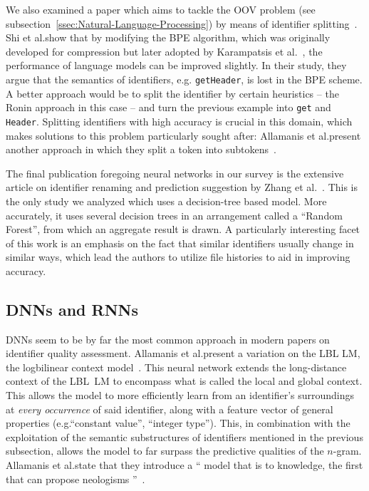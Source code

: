 \documentclass[conference]{IEEEtran}
\begin{document}
We also examined a paper which aims to tackle the \ac{OOV} problem (see
subsection~\ref{ssec:Natural-Language-Processing}) by means of identifier
splitting~\cite{Shi2022Splitting}. Shi et al.\@ show that by modifying the \ac{BPE}
algorithm, which was originally developed for compression but later adopted by Karampatsis
et al.\@~\cite{Karampatsis2020BPE}, the performance of language models can be improved
slightly. In their study, they argue that the semantics of identifiers, e.g.\@
\verb-getHeader-, is lost in the \ac{BPE} scheme. A better approach would be to split the
identifier by certain heuristics -- the Ronin approach in this case -- and turn the
previous example into \verb-get- and \verb-Header-. Splitting identifiers with high
accuracy is crucial in this domain, which makes solutions to this problem particularly
sought after: Allamanis et al.\@ present another approach in which they split a token into
subtokens~\cite{Allamanis2015Suggesting}.

The final publication foregoing neural networks in our survey is the extensive article on
identifier renaming and prediction suggestion by Zhang et
al.~\cite{Zhang2023RenamingPrediction}. This is the only study we analyzed which uses a
decision-tree based model. More accurately, it uses several decision trees in an
arrangement called a \enquote{Random Forest}, from which an aggregate result is drawn. A
particularly interesting facet of this work is an emphasis on the fact that similar
identifiers usually change in similar ways, which lead the authors to utilize file
histories to aid in improving accuracy.


\subsection{\acsp{DNN} and \acp{RNN}}
\label{ssec:DNNs-RNNs-and-LSTMs}

\acp{DNN} seem to be by far the most common approach in modern papers on identifier
quality assessment. Allamanis et al.\@ present a variation on the \ac{LBL} \ac{LM}, the
logbilinear context model~\cite{Allamanis2015Suggesting}. This neural network extends the
long-distance context of the \ac{LBL}~\ac{LM} to encompass what is called the local and
global context. This allows the model to more efficiently learn from an identifier's
surroundings at \emph{every occurrence} of said identifier, along with a feature vector of
general properties (e.g.\@ \enquote{constant value}, \enquote{integer type}). This, in
combination with the exploitation of the semantic substructures of identifiers mentioned
in the previous subsection, allows the model to far surpass the predictive qualities of
the $n$-gram. Allamanis et al.\@ state that they introduce a \enquote{\textelp{} model
that is to  knowledge, the first that can propose neologisms
\textelp{}}~\cite{Allamanis2015Suggesting}.
\end{document}
